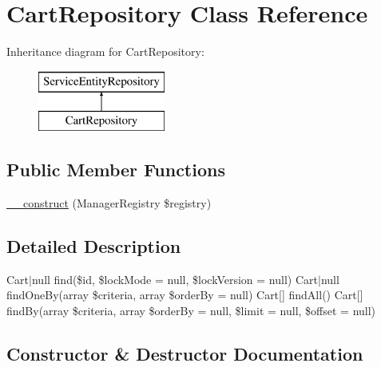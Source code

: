 \hypertarget{class_app_1_1_repository_1_1_cart_repository}{}\section{Cart\+Repository Class Reference}
\label{class_app_1_1_repository_1_1_cart_repository}
Inheritance diagram for Cart\+Repository\+:\begin{figure}[H]
\begin{center}
\leavevmode
\includegraphics[height=2.000000cm]{class_app_1_1_repository_1_1_cart_repository}
\end{center}
\end{figure}
\subsection*{Public Member Functions}
\begin{DoxyCompactItemize}
\item 
\mbox{\hyperlink{class_app_1_1_repository_1_1_cart_repository_a38ea33dde11163765f358f5f10a3bc03}{\+\_\+\+\_\+construct}} (Manager\+Registry \$registry)
\end{DoxyCompactItemize}


\subsection{Detailed Description}
Cart$\vert$null find(\$id, \$lock\+Mode = null, \$lock\+Version = null)  Cart$\vert$null find\+One\+By(array \$criteria, array \$order\+By = null)  Cart\mbox{[}\mbox{]} find\+All()  Cart\mbox{[}\mbox{]} find\+By(array \$criteria, array \$order\+By = null, \$limit = null, \$offset = null) 

\subsection{Constructor \& Destructor Documentation}
\mbox{\label{class_app_1_1_repository_1_1_cart_repository_a38ea33dde11163765f358f5f10a3bc03}} 
